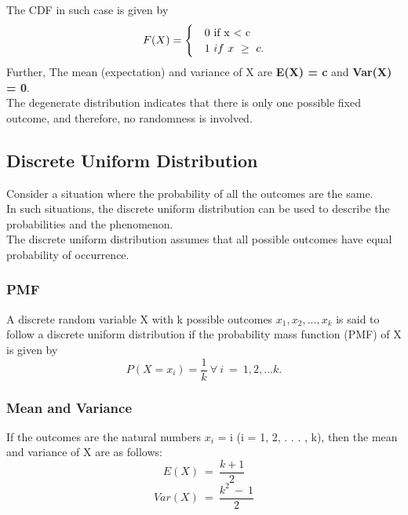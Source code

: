The CDF in such case is given by
\begin{equation}
F(X) = 
\begin{cases}
&$0\ if\ x\ <\ c$\\
&1\ if\ x\ \geq \ c.
\end{cases}
\end{equation}
Further, The mean (expectation) and variance of X are \textbf{E(X) = c}
and \textbf{Var(X) = 0}.\\
The degenerate distribution indicates that there is only one possible
fixed outcome, and therefore, no randomness is involved.

\subsection*{Discrete Uniform Distribution}
Consider a situation where the probability of all the outcomes are
the same.\\
In such situations, the discrete uniform distribution can be used to
describe the probabilities and the phenomenon.\\
The discrete uniform distribution assumes that all possible outcomes
have equal probability of occurrence.
\subsubsection*{PMF}
A discrete random variable X with k possible outcomes $x_1, x_2, . . . ,x_k$
is said to follow a discrete uniform distribution if the probability
mass function (PMF) of X is given by
\[ P(X = x_i) = \frac{1}{k} \ \forall \ i\ =\ 1,2,...k.\]
\subsubsection*{Mean and Variance}
If the outcomes are the natural numbers $x_i$ = i (i = 1, 2, . . . , k), then
the mean and variance of X are as follows:
\[ E(X)\ =\ \frac{k+1}{2} \]
\[ Var(X)\ =\ \frac{k^2\ -\ 1}{2} \]

